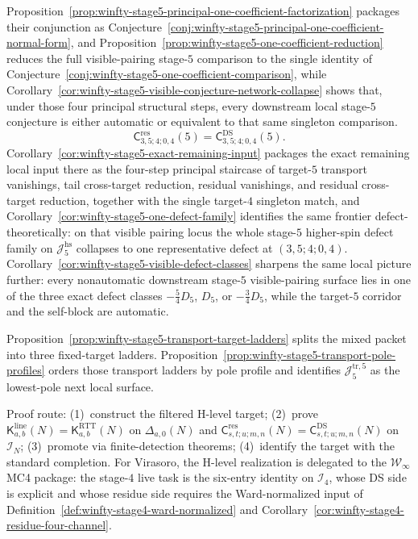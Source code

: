 \begin{remark}
Proposition~\ref{prop:winfty-stage5-principal-one-coefficient-factorization}
packages their conjunction as
Conjecture~\ref{conj:winfty-stage5-principal-one-coefficient-normal-form},
and Proposition~\ref{prop:winfty-stage5-one-coefficient-reduction}
reduces the full visible-pairing stage-$5$ comparison to the single
identity of Conjecture~\ref{conj:winfty-stage5-one-coefficient-comparison},
while
Corollary~\ref{cor:winfty-stage5-visible-conjecture-network-collapse}
shows that, under those four principal structural steps, every
downstream local stage-$5$ conjecture is either automatic or equivalent
to that same singleton comparison.
\[
\mathsf{C}^{\mathrm{res}}_{3,5;4;0,4}(5)
=
\mathsf{C}^{\mathrm{DS}}_{3,5;4;0,4}(5).
\]
Corollary~\ref{cor:winfty-stage5-exact-remaining-input} packages the
exact remaining local input there as the four-step principal staircase
of target-$5$ transport vanishings, tail cross-target reduction,
residual vanishings, and residual cross-target reduction, together with
the single target-$4$ singleton match, and
Corollary~\ref{cor:winfty-stage5-one-defect-family} identifies the same
frontier defect-theoretically: on that visible pairing locus the whole
stage-$5$ higher-spin defect family on \(\mathcal{J}_5^{\mathrm{hs}}\)
collapses to one representative defect at \((3,5;4;0,4)\).
Corollary~\ref{cor:winfty-stage5-visible-defect-classes} sharpens the
same local picture further: every nonautomatic downstream stage-$5$
visible-pairing surface lies in one of the three exact defect classes
\(-\tfrac54 D_5\), \(D_5\), or \(-\tfrac34 D_5\), while the target-$5$
corridor and the self-block are automatic.

Proposition~\ref{prop:winfty-stage5-transport-target-ladders}
splits the mixed packet into three fixed-target ladders.
Proposition~\ref{prop:winfty-stage5-transport-pole-profiles} orders
those transport ladders by pole profile and identifies
$\mathcal{J}_5^{\mathrm{tr},5}$ as the lowest-pole next local surface.

Proof route: (1)~construct the filtered H-level target; (2)~prove $\mathsf{K}^{\mathrm{line}}_{a,b}(N) = \mathsf{K}^{\mathrm{RTT}}_{a,b}(N)$ on $\Delta_{a,0}(N)$ and $\mathsf{C}^{\mathrm{res}}_{s,t;u;m,n}(N) = \mathsf{C}^{\mathrm{DS}}_{s,t;u;m,n}(N)$ on $\mathcal{I}_N$; (3)~promote via finite-detection theorems; (4)~identify the target with the standard completion.  For Virasoro, the H-level realization is delegated to the $\mathcal{W}_\infty$ MC4 package: the stage-$4$ live task is the six-entry identity on $\mathcal{I}_4$, whose DS side is explicit and whose residue side requires the Ward-normalized input of Definition~\ref{def:winfty-stage4-ward-normalized} and Corollary~\ref{cor:winfty-stage4-residue-four-channel}.


\end{remark}
